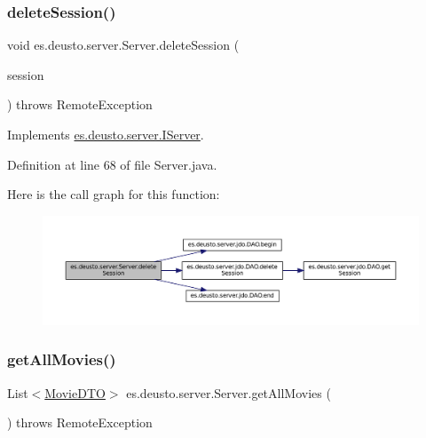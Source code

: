 \subsubsection{\texorpdfstring{deleteSession()}{deleteSession()}}
{\footnotesize\ttfamily void es.\+deusto.\+server.\+Server.\+delete\+Session (\begin{DoxyParamCaption}\item[{\mbox{\hyperlink{classes_1_1deusto_1_1server_1_1data_1_1_session_d_t_o}{Session\+D\+TO}}}]{session }\end{DoxyParamCaption}) throws Remote\+Exception}



Implements \mbox{\hyperlink{interfacees_1_1deusto_1_1server_1_1_i_server_a69878460a3fb5dfc077308e1cd3a8d34}{es.\+deusto.\+server.\+I\+Server}}.



Definition at line 68 of file Server.\+java.

Here is the call graph for this function\+:
\nopagebreak
\begin{figure}[H]
\begin{center}
\leavevmode
\includegraphics[width=350pt]{classes_1_1deusto_1_1server_1_1_server_aad2637c9cecc8a8b6f89e630b3711bff_cgraph}
\end{center}
\end{figure}
\mbox{\label{classes_1_1deusto_1_1server_1_1_server_a12879447707ea74459bfed6fffab514b}} 
\subsubsection{\texorpdfstring{getAllMovies()}{getAllMovies()}}
{\footnotesize\ttfamily List$<$\mbox{\hyperlink{classes_1_1deusto_1_1server_1_1data_1_1_movie_d_t_o}{Movie\+D\+TO}}$>$ es.\+deusto.\+server.\+Server.\+get\+All\+Movies (\begin{DoxyParamCaption}{ }\end{DoxyParamCaption}) throws Remote\+Exception}



